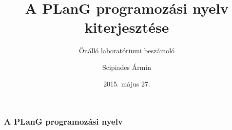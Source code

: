 \documentclass{beamer}
\title{A PLanG programozási nyelv kiterjesztése}
\subtitle{Önálló laboratóriumi beszámoló}
\author{Scipiades Ármin}
\date{2015. május 27.}
\begin{document}
\frame{\titlepage}

\begin{frame}
	\frametitle{A PLanG programozási nyelv}
\end{frame}
\end{document}
